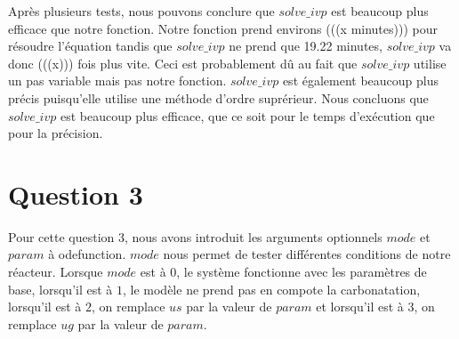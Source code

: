 \documentclass[11pt]{report}
\newcommand{\mychapter}[2]{
    \setcounter{chapter}{#1}
    \setcounter{section}{0}
    \chapter*{#2}
    \addcontentsline{toc}{chapter}{#2}
}
\begin{document}
            \par
            Après plusieurs tests, nous pouvons conclure que $solve\_ivp$ est beaucoup plus efficace que notre fonction.
            Notre fonction prend environs (((x minutes))) pour résoudre l'équation tandis que $solve\_ivp$ ne prend que 19.22 minutes,
            $solve\_ivp$ va donc (((x))) fois plus vite.
            Ceci est probablement dû au fait que $solve\_ivp$ utilise un pas variable mais pas notre fonction.
            $solve\_ivp$ est également beaucoup plus précis puisqu'elle utilise une méthode d'ordre suprérieur.
            Nous concluons que $solve\_ivp$ est beaucoup plus efficace, que ce soit pour le temps d'exécution que pour la précision.
    \mychapter{3}{Question 3}
        Pour cette question 3, nous avons introduit les arguments optionnels $mode$ et $param$ à odefunction.
        $mode$ nous permet de tester différentes conditions de notre réacteur.
        Lorsque $mode$ est à $0$, le système fonctionne avec les paramètres de base,
        lorsqu'il est à $1$, le modèle ne prend pas en compote la carbonatation,
        lorsqu'il est à $2$, on remplace $us$ par la valeur de $param$
        et lorsqu'il est à $3$, on remplace $ug$ par la valeur de $param$.
\end{document}
